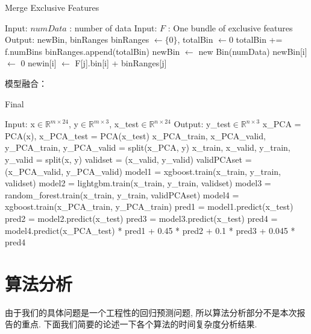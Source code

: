 \documentclass[a4paper,UTF8]{article}
\begin{document}
\begin{algorithm}[H]
  \caption{Merge Exclusive Features}
  \begin{algorithmic}
    \STATE Input: $numData$ : number of data
    \STATE Input: $F$ : One bundle of exclusive features
    \STATE Output: newBin, binRanges
    \STATE binRanges $\leftarrow \{0\}$, totalBin $\leftarrow 0$
        \STATE totalBin += f.numBins
        \STATE binRanges.append(totalBin)
      \ENDFOR
        \STATE newBin $\leftarrow$ new Bin(numData) 
        \STATE newBin[i] $\leftarrow$ 0
            \STATE newin[i] $\leftarrow$ F[j].bin[i] + binRanges[j]
          \ENDIF
        \ENDFOR
      \ENDFOR
  \end{algorithmic}
\end{algorithm}

模型融合：
\begin{algorithm}[H]
	\caption{Final}
	  \begin{algorithmic}  %
      \STATE Input: x$\in \mathbb{R}^{m\times 24}$, y$\in \mathbb{R}^{m\times 3}$, x\_test$\in \mathbb{R}^{n\times 24}$
      \STATE Output:  y\_test$\in \mathbb{R}^{n\times 3}$
        \STATE x\_PCA = PCA(x), x\_PCA\_test = PCA(x\_test)
        \STATE x\_PCA\_train, x\_PCA\_valid, y\_PCA\_train, y\_PCA\_valid = split(x\_PCA, y)
        \STATE x\_train, x\_valid, y\_train, y\_valid = split(x, y)
        \STATE validset = (x\_valid, y\_valid)
        \STATE validPCAset = (x\_PCA\_valid, y\_PCA\_valid)
        \STATE model1 = xgboost.train(x\_train, y\_train, validset)
        \STATE model2 = lightgbm.train(x\_train, y\_train, validset)
        \STATE model3 = random\_forest.train(x\_train, y\_train, validPCAset)
        \STATE model4 = xgboost.train(x\_PCA\_train, y\_PCA\_train)
        \STATE pred1 = model1.predict(x\_test)
        \STATE pred2 = model2.predict(x\_test)
        \STATE pred3 = model3.predict(x\_test)
        \STATE pred4 = model4.predict(x\_PCA\_test)
	     pred1 + 0.45 * pred2 + 0.1 * pred3 + 0.045 * pred4
	  \end{algorithmic}
  \end{algorithm}

\newpage
\section{算法分析}
由于我们的具体问题是一个工程性的回归预测问题, 所以算法分析部分不是本次报告的重点. 下面我们简要的论述一下各个算法的时间复杂度分析结果.
\end{document}
